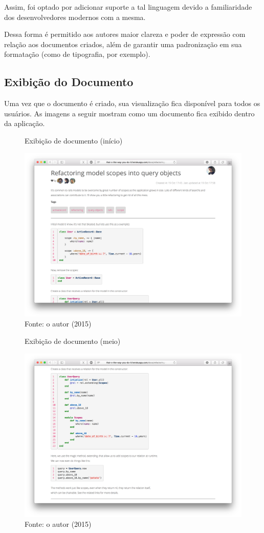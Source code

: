 Assim, foi optado por adicionar suporte a tal linguagem devido a familiaridade dos desenvolvedores modernos com a mesma.

Dessa forma é permitido aos autores maior clareza e poder de expressão com relação aos documentos criados, além de garantir uma padronização em sua formatação (como de tipografia, por exemplo).

\subsection{Exibição do Documento}

Uma vez que o documento é criado, sua visualização fica disponível para todos os usuários. As imagens a seguir mostram como um documento fica exibido dentro da aplicação.

\begin{figure}[h]
	\centering
    \caption{Exibição de documento (início)}
    \includegraphics[width=15cm]{Imagens/print-show-1.png}
	\caption*{Fonte: o autor (2015)}
\end{figure}

\begin{figure}[h]
	\centering
    \caption{Exibição de documento (meio)}
    \includegraphics[width=15cm]{Imagens/print-show-2.png}
	\caption*{Fonte: o autor (2015)}
\end{figure}


